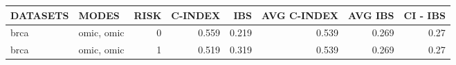 \begin{tabular}{llrrrrrr}
\hline
 DATASETS   & MODES      &   RISK &   C-INDEX &   IBS &   AVG C-INDEX &   AVG IBS &   CI - IBS \\
\hline
 brca       & omic, omic &      0 &     0.559 & 0.219 &         0.539 &     0.269 &       0.27 \\
 brca       & omic, omic &      1 &     0.519 & 0.319 &         0.539 &     0.269 &       0.27 \\
\hline
\end{tabular}